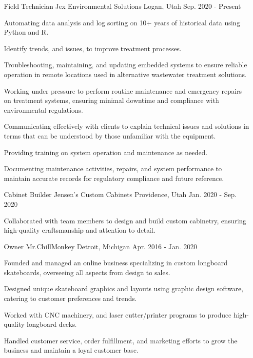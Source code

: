 \documentclass[11pt, a4paper]{awesome-cv}
\begin{document}
  \begin{cventries}

    \cventry
      {Field Technician}
      {Jex Environmental Solutions}
      {Logan, Utah}
      {Sep. 2020 - Present}
      {
        \begin{cvitems}
          \item {Automating data analysis and log sorting on 10+ years of historical data using Python and R.}
          \item {Identify trends, and issues, to improve treatment processes.}
          \item {Troubleshooting, maintaining, and updating embedded systems to ensure reliable operation in remote locations used in alternative wastewater treatment solutions.}
          \item {Working under pressure to perform routine maintenance and emergency repairs on treatment systems, ensuring minimal downtime and compliance with environmental regulations.}
          \item {Communicating effectively with clients to explain technical issues and solutions in terms that can be understood by those unfamiliar with the equipment.}
          \item {Providing training on system operation and maintenance as needed.}
          \item {Documenting maintenance activities, repairs, and system performance to maintain accurate records for regulatory compliance and future reference.}
        \end{cvitems}
      }

    \cventry
      {Cabinet Builder}
      {Jensen's Custom Cabinets}
      {Providence, Utah}
      {Jan. 2020 - Sep. 2020}
      {
        \begin{cvitems}
          \item {Collaborated with team members to design and build custom cabinetry, ensuring high-quality craftsmanship and attention to detail.}
        \end{cvitems}
      }

    \cventry
      {Owner}
      {Mr.ChillMonkey}
      {Detroit, Michigan}
      {Apr. 2016 - Jan. 2020}
      {
        \begin{cvitems}
          \item {Founded and managed an online business specializing in custom longboard skateboards, overseeing all aspects from design to sales.}
          \item {Designed unique skateboard graphics and layouts using graphic design software, catering to customer preferences and trends.}
          \item {Worked with CNC machinery, and laser cutter/printer programs to produce high-quality longboard decks.}
          \item {Handled customer service, order fulfillment, and marketing efforts to grow the business and maintain a loyal customer base.}
        \end{cvitems}
      }

  \end{cventries}
\end{document}
